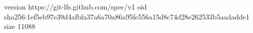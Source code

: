 version https://git-lfs.github.com/spec/v1
oid sha256:1ef5eb97e39d4afbfa37a6a70a86a95fe556a15d8c74d28e262533b5aadadde1
size 11088
